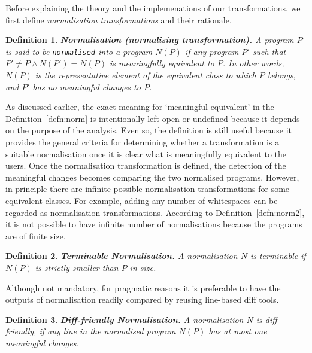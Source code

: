\documentclass[10pt, conference, compsocconf]{IEEEtran}
\newtheorem{definition}{Definition}
\begin{document}
Before explaining the theory and the implemenations of our transformations, we first define {\em normalisation transformations} and their rationale.
\begin{definition}
{\bf Normalisation (normalising transformation).\label{defn:norm}} A program $P$ is said to be {\tt normalised} into a program $N(P)$ if any program $P'$ such that $P'\neq P \wedge N(P') = N(P)$ is {\em meaningfully equivalent} to $P$. In other words, $N(P)$ is the representative element of the equivalent class to which $P$ belongs, and $P'$ has no meaningful changes to $P$.
\end{definition}
As discussed earlier, the exact meaning for `meaningful equivalent' in  the Definition~\ref{defn:norm} is intentionally left open or undefined because it depends on the purpose of the analysis. Even so, the definition is still useful because it provides the general criteria for determining whether a transformation is a suitable normalisation once it is clear what is meaningfully equivalent to the users. Once the normalisation transformation is defined, the detection of the meaningful changes becomes comparing the two normalised programs. However, in principle there are infinite possible normalisation transformations for some equivalent classes. For example, adding any number of whitespaces can be regarded as normalisation transformations. 
According to Definition~\ref{defn:norm2}, it is not possible to have infinite number of normalisations because the programs are of finite size.
\begin{definition}
{\bf Terminable Normalisation.\label{defn:norm2}} A normalisation $N$ is terminable if $N(P)$ is strictly smaller than $P$ in size.
\end{definition}

Although not mandatory, for pragmatic reasons it is preferable to have the outputs of normalisation readily compared by reusing line-based diff tools. 
\begin{definition}
{\bf Diff-friendly Normalisation.\label{defn:norm3}} A normalisation $N$ is diff-friendly, if any line in the normalised program $N(P)$ has at most one meaningful changes.
\end{definition}
\end{document}
